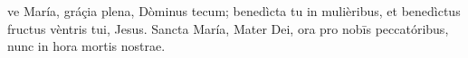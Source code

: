 ve María, gráçia plena, Dòminus tecum; benedìcta tu in mulièribus, et benedìctus fructus vèntris tui, Jesus. Sancta María, Mater Dei, ora pro nobīs peccatóribus, nunc in hora mortis nostrae.

